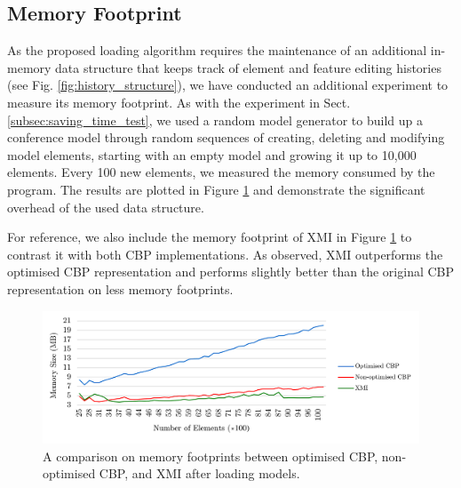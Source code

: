 \documentclass{llncs}
\begin{document}
         
\subsection{Memory Footprint}
\label{subsec:memory_consumption}
As the proposed loading algorithm requires the maintenance of an additional in-memory data structure that keeps track of element and feature editing histories (see Fig. \ref{fig:history_structure}), we have conducted an additional experiment to measure its memory footprint. As with the experiment in Sect. \ref{subsec:saving_time_test}, we used a random model generator to build up a conference model through random sequences of creating, deleting and modifying model elements, starting with an empty model and growing it up to 10,000 elements. Every 100 new elements, we measured the memory consumed by the program. The results are plotted in Figure \ref{fig:memory_ocbp_cbp_xmi} and demonstrate the significant overhead of the used data structure.

For reference, we also include the memory footprint of XMI in Figure \ref{fig:memory_ocbp_cbp_xmi} to contrast it with both CBP implementations. As observed, XMI outperforms the optimised CBP representation and performs slightly better than the original CBP representation on less memory footprints. 

\begin{figure}[ht]	
\centering
\includegraphics[width=\linewidth]{memory_ocbp_cbp_xmi}
		\caption{A comparison on memory footprints between optimised CBP, non-optimised CBP, and XMI after loading models.}\label{fig:memory_ocbp_cbp_xmi}
\end{figure}
\end{document}
